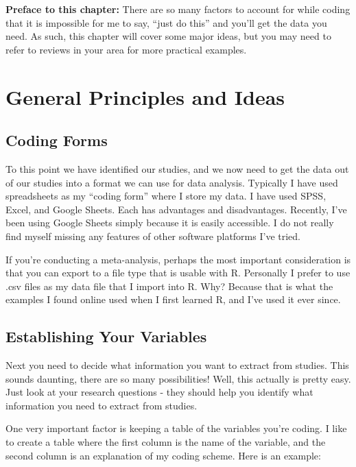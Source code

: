 \documentclass[
]{book}
\begin{document}
\textbf{Preface to this chapter:} There are so many factors to account for while coding that it is impossible for me to say, ``just do this'' and you'll get the data you need. As such, this chapter will cover some major ideas, but you may need to refer to reviews in your area for more practical examples.

\hypertarget{general-principles-and-ideas}{%
\section{General Principles and Ideas}\label{general-principles-and-ideas}}

\hypertarget{coding-forms}{%
\subsection{Coding Forms}\label{coding-forms}}

To this point we have identified our studies, and we now need to get the data out of our studies into a format we can use for data analysis. Typically I have used spreadsheets as my ``coding form'' where I store my data. I have used SPSS, Excel, and Google Sheets. Each has advantages and disadvantages. Recently, I've been using Google Sheets simply because it is easily accessible. I do not really find myself missing any features of other software platforms I've tried.

If you're conducting a meta-analysis, perhaps the most important consideration is that you can export to a file type that is usable with R. Personally I prefer to use .csv files as my data file that I import into R. Why? Because that is what the examples I found online used when I first learned R, and I've used it ever since. ~

\hypertarget{establishing-your-variables}{%
\subsection{Establishing Your Variables}\label{establishing-your-variables}}

Next you need to decide what information you want to extract from studies. This sounds daunting, there are so many possibilities! Well, this actually is pretty easy. Just look at your research questions - they should help you identify what information you need to extract from studies.

One very important factor is keeping a table of the variables you're coding. I like to create a table where the first column is the name of the variable, and the second column is an explanation of my coding scheme. Here is an example:
\end{document}
